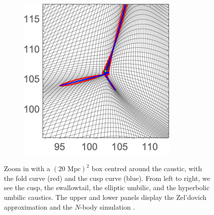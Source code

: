 \documentclass[a4paper, 11pt]{article}
\begin{document}
\begin{figure}
\begin{subfigure}[b]{0.24\textwidth}
\end{subfigure}~
\begin{subfigure}[b]{0.24\textwidth}
\includegraphics[width=\textwidth]{Hyperbolic_Nb_Zoom}
\end{subfigure}
\caption{Zoom in with a $(20 \text{ Mpc})^2$ box centred around the caustic, with the fold curve (red) and the cusp curve (blue). From left to right, we see the cusp, the swallowtail, the elliptic umbilic, and the hyperbolic umbilic caustics. The upper and lower panels display the Zel'dovich approximation and the $N$-body simulation \cite{Hidding:2020}.}\label{fig:caustics_Examples_Small}
\end{figure}
\end{document}
